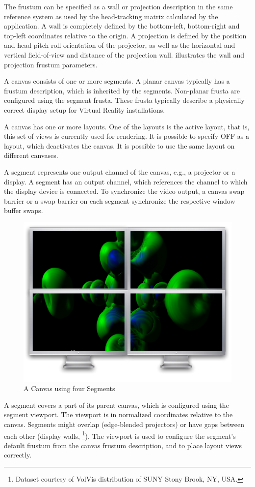 The frustum can be specified as a wall or projection description in the same
reference system as used by the head-tracking matrix calculated by the
application.  A wall is completely defined by the bottom-left, bottom-right and
top-left coordinates relative to the origin.  A projection is defined by the
position and head-pitch-roll orientation of the projector, as well as the
horizontal and vertical field-of-view and distance of the projection wall.
 illustrates the wall and projection frustum parameters.

A canvas consists of one or more segments. A planar canvas typically has a
frustum description, which is inherited by the segments. Non-planar frusta are
configured using the segment frusta. These frusta typically describe a
physically correct display setup for Virtual Reality installations.

A canvas has one or more layouts. One of the layouts is the active
layout, that is, this set of views is currently used for rendering. It
is possible to specify \textsf{OFF} as a layout, which deactivates the
canvas. It is possible to use the same layout on different canvases.

A \textsf{segment} represents one output channel of the canvas, e.g., a
projector or a display. A segment has an output channel, which references the
channel to which the display device is connected. To synchronize the video
output, a canvas swap barrier or a swap barrier on each segment synchronize the
respective window buffer swaps.

\begin{figure}
  \includegraphics[width=.382\textwidth]{images/canvas.pdf}
  {\caption{\label{fCanvas}A Canvas using four Segments}}
\end{figure}

A segment covers a part of its parent canvas, which is configured using the
segment viewport. The viewport is in normalized coordinates relative to the
canvas. Segments might overlap (edge-blended projectors) or have gaps between
each other (display walls, \footnote{Dataset courtesy of VolVis
 distribution of SUNY Stony Brook, NY, USA.}). The viewport is used to
configure the segment's default frustum from the canvas frustum description, and
to place layout views correctly.

